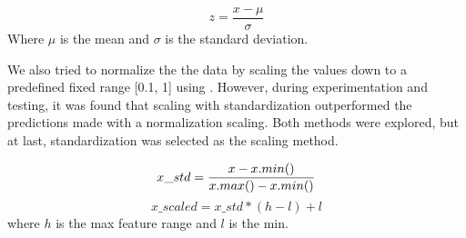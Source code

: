 \begin{equation}
  z = \frac{x - \mu}{\sigma}
  \label{eq:standardization}
\end{equation}
Where $\mu$ is the mean and $\sigma$ is the standard deviation.



We also tried to normalize the the data by scaling the values down to a predefined fixed range
  [0.1, 1] using .
However, during experimentation and testing, it was found that scaling with standardization
outperformed the predictions made with a normalization scaling.
Both methods were explored, but at last, standardization was selected as the scaling method.

\begin{equation}
  x\_std = \frac{x - x.min()}{x.max() - x.min()} \newline
  \label{eq:normalization}
\end{equation}
\begin{equation}
  x\_scaled = x\_std * (h - l) + l
  \label{eq:normalization2}
\end{equation}
where $h$ is the max feature range and $l$ is the min.

